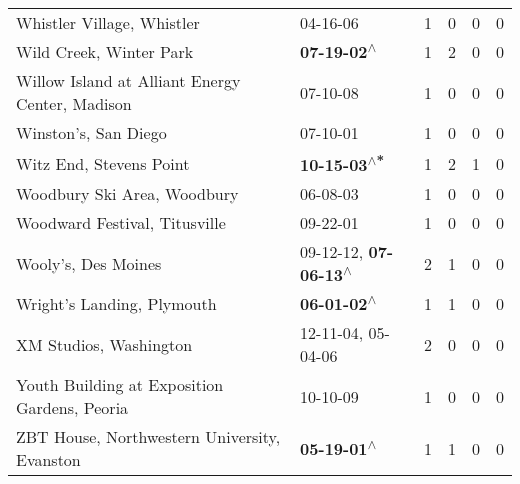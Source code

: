 \begin{supertabular}{p{0.4\textwidth}p{0.3\textwidth}p{0.05\textwidth}p{0.05\textwidth}p{0.05\textwidth}p{0.05\textwidth}}
                                                   Whistler Village, Whistler &                                                                  04-16-06\textsuperscript{} &  1 &  0 &  0 &  0 \\
                                                      Wild Creek, Winter Park &                                                 \textbf{07-19-02\textsuperscript{$\wedge$}} &  1 &  2 &  0 &  0 \\
                              Willow Island at Alliant Energy Center, Madison &                                                                  07-10-08\textsuperscript{} &  1 &  0 &  0 &  0 \\
                                                         Winston's, San Diego &                                                                  07-10-01\textsuperscript{} &  1 &  0 &  0 &  0 \\
                                                      Witz End, Stevens Point &                                                \textbf{10-15-03\textsuperscript{$\wedge$*}} &  1 &  2 &  1 &  0 \\
                                                  Woodbury Ski Area, Woodbury &                                                                  06-08-03\textsuperscript{} &  1 &  0 &  0 &  0 \\
                                                Woodward Festival, Titusville &                                                                  09-22-01\textsuperscript{} &  1 &  0 &  0 &  0 \\
                                                          Wooly's, Des Moines &                     09-12-12\textsuperscript{}, \textbf{07-06-13\textsuperscript{$\wedge$}} &  2 &  1 &  0 &  0 \\
                                                   Wright's Landing, Plymouth &                                                 \textbf{06-01-02\textsuperscript{$\wedge$}} &  1 &  1 &  0 &  0 \\
                                                       XM Studios, Washington &                                      12-11-04\textsuperscript{}, 05-04-06\textsuperscript{} &  2 &  0 &  0 &  0 \\
                                 Youth Building at Exposition Gardens, Peoria &                                                                  10-10-09\textsuperscript{} &  1 &  0 &  0 &  0 \\
                                 ZBT House, Northwestern University, Evanston &                                                 \textbf{05-19-01\textsuperscript{$\wedge$}} &  1 &  1 &  0 &  0 \\

\end{supertabular}
